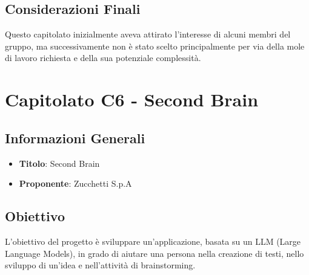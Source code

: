 \documentclass[a4paper,12pt]{article}
\begin{document}
    \subsection{Considerazioni Finali}
    Questo capitolato inizialmente aveva attirato l’interesse di alcuni membri del gruppo, ma successivamente non è stato scelto principalmente per via della mole di lavoro richiesta e della sua potenziale complessità.


    \section{Capitolato C6 - Second Brain}
    \subsection{Informazioni Generali}
        \begin{itemize}
            \item \textbf{Titolo}: Second Brain
            \item \textbf{Proponente}: Zucchetti S.p.A
        \end{itemize}
    \subsection{Obiettivo}
    L’obiettivo del progetto è sviluppare un’applicazione, basata su un LLM (Large Language Models), in grado di aiutare una persona nella creazione di testi, nello sviluppo di un’idea e nell’attività di brainstorming.
\end{document}
